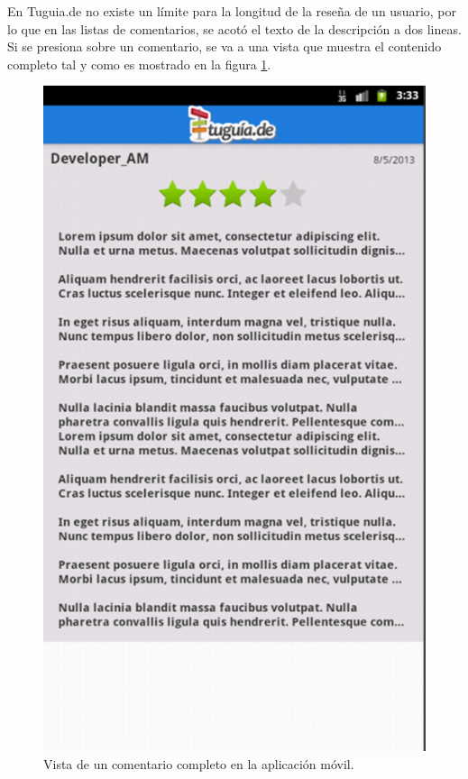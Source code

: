 En Tuguia.de no existe un límite para la longitud de la reseña de un usuario, por lo que en las listas de comentarios, se acotó el texto de la descripción a dos lineas. Si se presiona sobre un comentario, se va a una vista que muestra el contenido completo tal y como es mostrado en la figura \ref{fig:comentario_full}.
\\
\begin{figure}[h]
	\begin{center}
		\includegraphics[scale=0.5]{imagenes/comentario_completo.png}
	\end{center}
	\caption{
		\label{fig:comentario_full}
		Vista de un comentario completo en la aplicación móvil.
	}
\end{figure}


